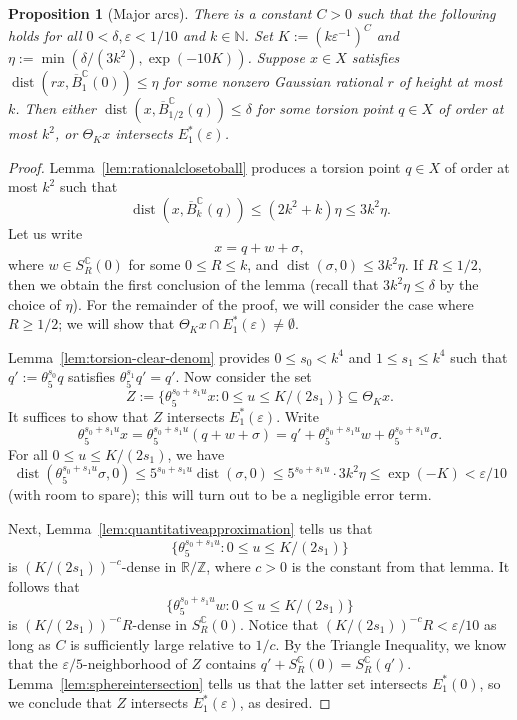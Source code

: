 \documentclass[11pt]{amsart}
\newtheorem{proposition}[lemma]{Proposition}
\theoremstyle{definition}
\newcommand{\C}{{\mathbb C}}
\newcommand{\R}{{\mathbb R}}
\newcommand{\Z}{{\mathbb Z}}
\DeclareMathOperator{\dist}{dist}
\begin{document}
\begin{proposition}[Major arcs]\label{prop:super-major}
There is a constant $C>0$ such that the following holds for all $0<\delta,\varepsilon<1/10$ and $k \in \mathbb{N}$.  Set $K:=(k\varepsilon^{-1})^C$ and $\eta:=\min(\delta/(3k^2), \exp(-10K))$.  Suppose $x \in X$ satisfies $\dist(rx, \overline{B}_1^{\C}(0)) \leq \eta$ for some nonzero Gaussian rational $r$ of height at most $k$.  Then either $\dist(x,\overline{B}_{1/2}^{\C}(q)) \leq \delta$ for some torsion point $q \in X$ of order at most $k^2$, or $\Theta_{K}x$ intersects $E^*_1(\varepsilon)$.
\end{proposition}

\begin{proof}
Lemma~\ref{lem:rationalclosetoball} produces a torsion point $q \in X$ of order at most $k^2$ such that
$$\dist(x,\overline{B}_k^{\C}(q)) \leq (2k^2+k)\eta \leq 3k^2 \eta.$$
Let us write
$$x=q+w+\sigma,$$
where $w \in S^{\C}_R(0)$ for some $0 \leq R \leq k$, and $\dist(\sigma,0) \leq 3k^2 \eta$.  If $R \leq 1/2$, then we obtain the first conclusion of the lemma (recall that $3k^2\eta \leq \delta$ by the choice of $\eta$).  For the remainder of the proof, we will consider the case where $R \geq 1/2$; we will show that $\Theta_K x \cap E^*_1(\varepsilon) \neq \emptyset$.

Lemma~\ref{lem:torsion-clear-denom} provides $0 \leq s_0<k^4$ and $1 \leq s_1 \leq k^4$ such that $q':=\theta_5^{s_0}q$ satisfies $\theta_5^{s_1}q'=q'$.  Now consider the set
$$Z:=\{\theta_5^{s_0+s_1u}x: 0 \leq u \leq K/(2s_1)\} \subseteq \Theta_{K}x.$$
It suffices to show that $Z$ intersects $E^*_1(\varepsilon)$.  Write
$$\theta_5^{s_0+s_1u}x=\theta_5^{s_0+s_1u}(q+w+\sigma)=q'+\theta_5^{s_0+s_1u}w+\theta_5^{s_0+s_1u}\sigma.$$
For all $0 \leq u \leq K/(2s_1)$, we have $$\dist(\theta_5^{s_0+s_1u}\sigma,0) \leq 5^{s_0+s_1u} \dist(\sigma,0) \leq 5^{s_0+s_1u} \cdot 3 k^2 \eta \leq \exp(-K)<\varepsilon/10$$
(with room to spare); this will turn out to be a negligible error term.

Next, Lemma~\ref{lem:quantitativeapproximation} tells us that $$\{\theta_5^{s_0+s_1 u}: 0\leq u \leq K/(2s_1)\}$$
is $(K/(2s_1))^{-c}$-dense in $\R/\Z$, where $c>0$ is the constant from that lemma.  It follows that
$$\{\theta_5^{s_0+s_1 u}w: 0\leq u \leq K/(2s_1)\}$$
is $(K/(2s_1))^{-c}R$-dense in $S^{\C}_R(0)$.  Notice that $(K/(2s_1))^{-c}R<\varepsilon/10$ as long as $C$ is sufficiently large relative to $1/c$.  By the Triangle Inequality, we know that the $\varepsilon/5$-neighborhood of $Z$ contains $q'+S_R^{\C}(0)=S_R^{\C}(q')$.  Lemma~\ref{lem:sphereintersection} tells us that the latter set intersects $E^*_1(0)$, so we conclude that $Z$ intersects $E^*_1(\varepsilon)$, as desired.
\end{proof}
\end{document}
